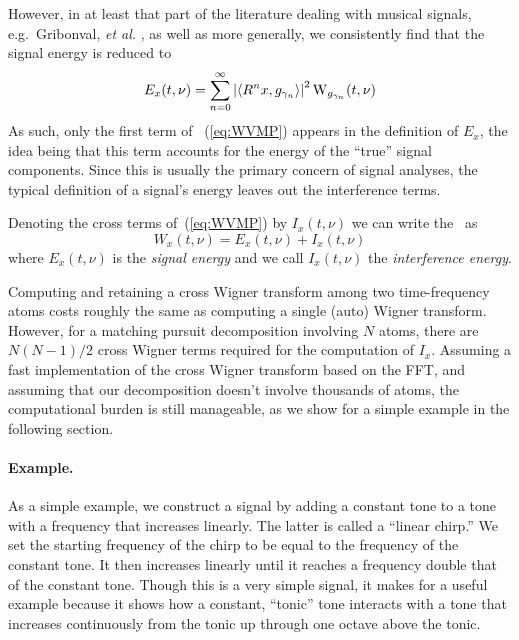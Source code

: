 However, in at least that part of the literature dealing with musical signals,
e.g.~Gribonval, {\it et al.} \citeyear{Gribonval:1996}, as well as more
generally, we consistently find that the signal energy is reduced to
\[
E_x(t,\nu) = \sum_{n=0}^\infty 
    \left|\langle R^nx,g_{\gamma_n}\rangle\right|^2 \operatorname{W}_{g_{\gamma_n}}(t,\nu) 
\]
As such, only the first term of%
~(\ref{eq:WVMP}) appears in the definition of $E_x$,
the idea being that this term accounts for the energy of the
``true'' signal components.  Since this is usually the primary concern of
signal analyses, the typical definition of a signal's energy
leaves out the interference terms.

Denoting the cross terms of~(\ref{eq:WVMP}) by $I_x(t,\nu)$
we can write the \WT\ as
\[
W_x(t,\nu)=E_x(t,\nu) +I_x(t,\nu) 
\]
where $E_x(t,\nu)$ is the \emph{signal energy} and we call $I_x(t,\nu)$ the
\emph{interference energy}.

Computing and retaining a cross Wigner transform among two time-frequency
atoms costs roughly the same as computing a single (auto) Wigner
transform. However, for a matching pursuit decomposition
involving $N$ atoms, there are $N(N-1)/2$ cross Wigner terms required for the
computation of $I_x$.
Assuming a fast implementation of the cross Wigner
transform based on the FFT, and assuming that our decomposition doesn't involve
thousands of atoms, the computational burden is still manageable, as we
show for a simple example in the following section.


\paragraph{Example.} As a simple example, we construct a signal by adding a
constant tone to a tone with a frequency that increases linearly. The latter
 is called a ``linear chirp.''  We set the starting frequency of the
 chirp to be equal to the frequency of the constant tone.  It then increases
 linearly until it reaches a frequency double that of the constant tone.
 Though this is a very simple signal, it makes for a useful example because it
 shows how a constant, ``tonic'' tone interacts with a tone that increases
 continuously from the tonic up through one octave above the tonic.   

